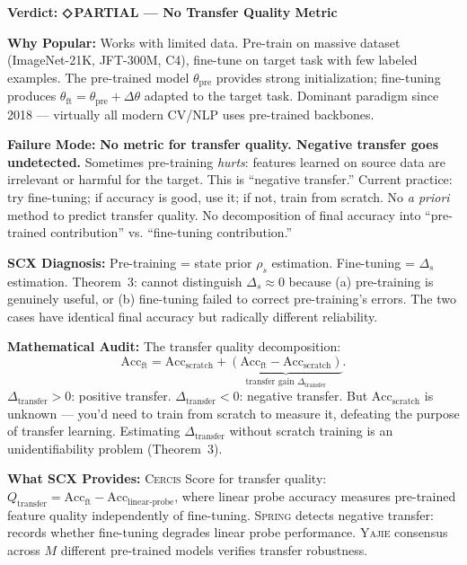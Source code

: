 \documentclass[12pt,a4paper]{article}
\theoremstyle{definition}
\newcommand{\weakness}{{\color{weakcolor}\textbf{◇\,PARTIAL}}}
\newcommand{\Yajie}{\textsc{Yajie}}
\newcommand{\Spring}{\textsc{Spring}}
\newcommand{\Cercis}{\textsc{Cercis}}
\newcommand{\auditHeader}[1]{\medskip\noindent\textbf{\large #1}\medskip}
\newcommand{\whyPopular}{\noindent\textbf{Why Popular:} }
\newcommand{\whyFail}{\noindent\textbf{Failure Mode:} }
\newcommand{\whatMissing}{\noindent\textbf{What SCX Provides:} }
\newcommand{\diagnosis}{\noindent\textbf{SCX Diagnosis:} }
\newcommand{\mathAudit}{\noindent\textbf{Mathematical Audit:} }
\begin{document}
\auditHeader{Verdict: \weakness{} — No Transfer Quality Metric}

\whyPopular{} Works with limited data. Pre-train on massive dataset (ImageNet-21K, JFT-300M, C4), fine-tune on target task with few labeled examples. The pre-trained model $\theta_{\text{pre}}$ provides strong initialization; fine-tuning produces $\theta_{\text{ft}} = \theta_{\text{pre}} + \Delta\theta$ adapted to the target task. Dominant paradigm since 2018 — virtually all modern CV/NLP uses pre-trained backbones.

\whyFail{} \textbf{No metric for transfer quality. Negative transfer goes undetected.} Sometimes pre-training \textit{hurts}: features learned on source data are irrelevant or harmful for the target. This is ``negative transfer.'' Current practice: try fine-tuning; if accuracy is good, use it; if not, train from scratch. No \textit{a priori} method to predict transfer quality. No decomposition of final accuracy into ``pre-trained contribution'' vs. ``fine-tuning contribution.''

\diagnosis{} Pre-training = state prior $\rho_s$ estimation. Fine-tuning = $\Delta_s$ estimation. Theorem~3: cannot distinguish $\Delta_s \approx 0$ because (a) pre-training is genuinely useful, or (b) fine-tuning failed to correct pre-training's errors. The two cases have identical final accuracy but radically different reliability.

\mathAudit{} The transfer quality decomposition:
\[
\text{Acc}_{\text{ft}} = \text{Acc}_{\text{scratch}} + \underbrace{(\text{Acc}_{\text{ft}} - \text{Acc}_{\text{scratch}})}_{\text{transfer gain } \Delta_{\text{transfer}}}.
\]
$\Delta_{\text{transfer}} > 0$: positive transfer. $\Delta_{\text{transfer}} < 0$: negative transfer. But $\text{Acc}_{\text{scratch}}$ is unknown — you'd need to train from scratch to measure it, defeating the purpose of transfer learning. Estimating $\Delta_{\text{transfer}}$ without scratch training is an unidentifiability problem (Theorem~3).

\whatMissing{} \Cercis{} Score for transfer quality: $Q_{\text{transfer}} = \text{Acc}_{\text{ft}} - \text{Acc}_{\text{linear-probe}}$, where linear probe accuracy measures pre-trained feature quality independently of fine-tuning. \Spring{} detects negative transfer: records whether fine-tuning degrades linear probe performance. \Yajie{} consensus across $M$ different pre-trained models verifies transfer robustness.

\end{document}
